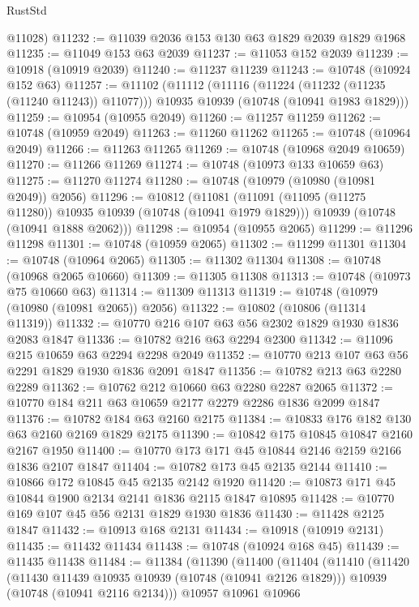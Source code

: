 \begin{lexlean}{RustStd}
\begin{coremodule}
{\begin{coremodule}
{{{{{      @11028)
@11232 := @11039 @2036 @153 @130 @63 @1829 @2039 @1829 @1968
@11235 := @11049 @153 @63 @2039
@11237 := @11053 @152 @2039
@11239 := @10918 (@10919 @2039)
@11240 := @11237 @11239
@11243 := @10748 (@10924 @152 @63)
@11257 := @11102
    (@11112
      (@11116 (@11224 (@11232 (@11235 (@11240 @11243)) @11077)))
      @10935
      @10939
      (@10748 (@10941 @1983 @1829)))
@11259 := @10954 (@10955 @2049)
@11260 := @11257 @11259
@11262 := @10748 (@10959 @2049)
@11263 := @11260 @11262
@11265 := @10748 (@10964 @2049)
@11266 := @11263 @11265
@11269 := @10748 (@10968 @2049 @10659)
@11270 := @11266 @11269
@11274 := @10748 (@10973 @133 @10659 @63)
@11275 := @11270 @11274
@11280 := @10748 (@10979 (@10980 (@10981 @2049)) @2056)
@11296 := @10812
    (@11081
      (@11091 (@11095 (@11275 @11280)) @10935 @10939 (@10748 (@10941 @1979 @1829)))
      @10939
      (@10748 (@10941 @1888 @2062)))
@11298 := @10954 (@10955 @2065)
@11299 := @11296 @11298
@11301 := @10748 (@10959 @2065)
@11302 := @11299 @11301
@11304 := @10748 (@10964 @2065)
@11305 := @11302 @11304
@11308 := @10748 (@10968 @2065 @10660)
@11309 := @11305 @11308
@11313 := @10748 (@10973 @75 @10660 @63)
@11314 := @11309 @11313
@11319 := @10748 (@10979 (@10980 (@10981 @2065)) @2056)
@11322 := @10802 (@10806 (@11314 @11319))
@11332 := @10770 @216 @107 @63 @56 @2302 @1829 @1930 @1836 @2083 @1847
@11336 := @10782 @216 @63 @2294 @2300
@11342 := @11096 @215 @10659 @63 @2294 @2298 @2049
@11352 := @10770 @213 @107 @63 @56 @2291 @1829 @1930 @1836 @2091 @1847
@11356 := @10782 @213 @63 @2280 @2289
@11362 := @10762 @212 @10660 @63 @2280 @2287 @2065
@11372 := @10770 @184 @211 @63 @10659 @2177 @2279 @2286 @1836 @2099 @1847
@11376 := @10782 @184 @63 @2160 @2175
@11384 := @10833 @176 @182 @130 @63 @2160 @2169 @1829 @2175
@11390 := @10842 @175 @10845 @10847 @2160 @2167 @1950
@11400 := @10770 @173 @171 @45 @10844 @2146 @2159 @2166 @1836 @2107 @1847
@11404 := @10782 @173 @45 @2135 @2144
@11410 := @10866 @172 @10845 @45 @2135 @2142 @1920
@11420 := @10873 @171 @45 @10844 @1900 @2134 @2141 @1836 @2115 @1847 @10895
@11428 := @10770 @169 @107 @45 @56 @2131 @1829 @1930 @1836
@11430 := @11428 @2125 @1847
@11432 := @10913 @168 @2131
@11434 := @10918 (@10919 @2131)
@11435 := @11432 @11434
@11438 := @10748 (@10924 @168 @45)
@11439 := @11435 @11438
@11484 := @11384
    (@11390
      (@11400
        (@11404
          (@11410
            (@11420
              (@11430 @11439 @10935 @10939 (@10748 (@10941 @2126 @1829)))
              @10939
              (@10748 (@10941 @2116 @2134)))
            @10957
            @10961
            @10966
}}}}}
\end{coremodule}}
\end{coremodule}
\end{lexlean}

